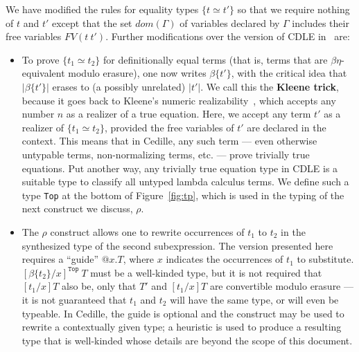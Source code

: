 \documentclass{article}
\begin{document}
We have modified the rules for equality types $\{ t \simeq t' \}$ so that we require
nothing of $t$ and $t'$ except that the set $\textit{dom}(\Gamma)$ of variables
declared by $\Gamma$ includes their free variables $\textit{FV}(t\ t')$.  Further modifications
over the version of CDLE in~\cite{stump18} are:
\begin{itemize}
\item To prove $\{ t_1 \simeq t_2\}$ for definitionally equal terms (that is,
  terms that are \(\beta\eta\)-equivalent modulo erasure), one now writes $\beta\{t'\}$,
  with the critical idea that $|\beta\{t'\}|$ erases to (a possibly unrelated) $|t'|$.
  We call this the \textbf{Kleene trick}, because it goes back to Kleene's numeric
  realizability~\cite{Kle65_Classical-Extensions-of-Intuitionistic-Mathematics},
  which accepts any number $n$ as a realizer 
  of a true equation.  Here, we accept any term $t'$ as a realizer of $\{ t_1
  \simeq t_2\}$, provided the free variables of \(t'\) are declared in the
  context.
  This means that in Cedille, any such term --- even otherwise untypable
  terms, non-normalizing terms, etc. --- prove trivially true equations.
  Put another way, any trivially true equation type in CDLE is a suitable type
  to classify all untyped lambda calculus terms.
  We define such a type \texttt{Top} at the bottom of Figure~\ref{fig:tp}, which
  is used in the typing of the next construct we discuss, \(\rho\).
\item The \(\rho\) construct allows one to rewrite occurrences of \(t_1\) to
  \(t_2\) in the synthesized type of the second subexpression.
  The version presented here requires a ``guide'' \(@x.T\), where \(x\)
  indicates the occurrences of \(t_1\) to substitute.
  \([\beta\{t_2\}/x]^{\texttt{Top}}\ T\) must be a well-kinded type, but it is not required that
  \([t_1/x]T\) also be, only that \(T'\) and \([t_1/x]T\) are convertible modulo
  erasure --- it is not guaranteed that \(t_1\) and \(t_2\) will have the same
  type, or will even be typeable.
  In Cedille, the guide is optional and the construct may be used to rewrite a
  contextually given type; a heuristic is used to produce a resulting type that
  is well-kinded whose details are beyond the scope of this document.


\end{itemize}
\end{document}
